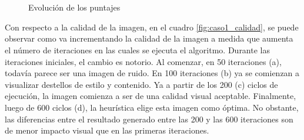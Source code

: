 \documentclass[a4paper,11pt,spanish]{book}
\begin{document}
	\begin{figure}[H]
	  \begin{center}
	    \\
	    \\
	  \end{center}
	  \caption{Evolución de los puntajes}
	  \label{fig:puntajes_caso1}
	\end{figure}
	
	Con respecto a la calidad de la imagen, en el cuadro \ref{fig:caso1_calidad}, se puede observar como va incrementando la calidad de la imagen a medida que aumenta el número
	de iteraciones en las cuales se ejecuta el algoritmo. 
	Durante las iteraciones iniciales, el cambio es notorio. Al comenzar, en 50 iteraciones (a), todavía parece ser una imagen de ruido. 
	En 100 iteraciones (b) ya se comienzan a visualizar destellos de estilo y contenido. Ya a partir de los 200 (c) ciclos de ejecución, la imagen comienza a ser de una calidad visual aceptable.
	Finalmente, luego de 600 ciclos (d), la heurística elige esta imagen como óptima. No obstante, las diferencias entre el resultado generado entre las 200 y las 600 iteraciones
	son de menor impacto visual que en las primeras iteraciones.
	
\end{document}
